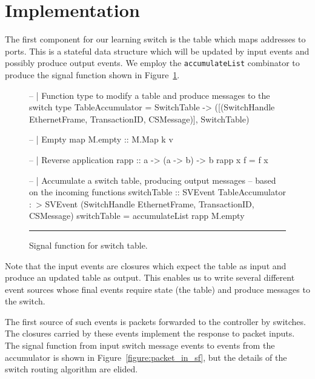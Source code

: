 \section{Implementation}
\label{section:Example_Application-Implementation}

The first component for our learning switch is the table which maps addresses
to ports. This is a stateful data structure which will be updated by input
events and possibly produce output events. We employ the {\tt accumulateList}
combinator to produce the signal function shown in Figure~\ref{figure:switch_table_sf}.

\begin{figure}
\begin{code}
-- | Function type to modify a table and produce messages to the switch
type TableAccumulator = 
     SwitchTable 
  -> ([(SwitchHandle EthernetFrame,
        TransactionID,
        CSMessage)],
      SwitchTable)

-- | Empty map
M.empty :: M.Map k v

-- | Reverse application
rapp :: a -> (a -> b) -> b
rapp x f = f x

-- | Accumulate a switch table, producing output messages
--   based on the incoming functions
switchTable ::    SVEvent TableAccumulator
              :~> SVEvent (SwitchHandle EthernetFrame,
                           TransactionID,
                           CSMessage)
switchTable = accumulateList rapp M.empty
\end{code}
\hrule
\caption{Signal function for switch table.}
\label{figure:switch_table_sf}
\end{figure}

Note that the input events are closures which expect the table as input and
produce an updated table as output. This enables us to write several different
event sources whose final events require state (the table) and produce
messages to the switch.

The first source of such events is packets forwarded to the controller by
switches. The closures carried by these events implement the response to
packet inputs. The signal function from input switch message events to events
from the accumulator is shown in Figure~\ref{figure:packet_in_sf}, but the
details of the switch routing algorithm are elided.

